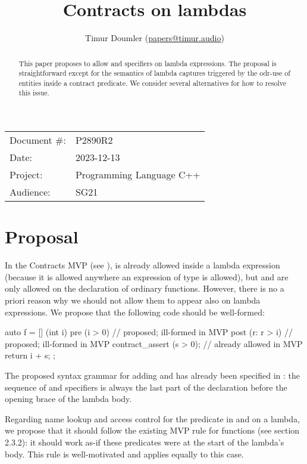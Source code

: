 


\title{Contracts on lambdas}
\author{ Timur Doumler \small(\href{mailto:papers@timur.audio}{papers@timur.audio})}
\date{}
\maketitle

\begin{tabular}{ll}
Document \#: & P2890R2 \\
Date: &2023-12-13 \\
Project: & Programming Language C++ \\
Audience: & SG21
\end{tabular}

\begin{abstract}
This paper proposes to allow  and  specifiers on lambda expressions. The proposal is straightforward except for the semantics of lambda captures triggered by the odr-use of entities inside a contract predicate. We consider several alternatives for how to resolve this issue.
\end{abstract}

\section{Proposal}
\label{sec:intro}

In the Contracts MVP (see \cite{P2900R2}),  is already allowed inside a lambda expression (because it is allowed anywhere an expression of type  is allowed), but  and  are only allowed on the declaration of ordinary functions. However, there is no a priori reason why we should not allow them to appear also on lambda expressions. We propose that the following code should be well-formed:
\begin{codeblock}
auto f = [] (int i)
  pre (i > 0)      // proposed; ill-formed in MVP
  post (r: r > i)  // proposed; ill-formed in MVP
{
  contract_assert (s > 0);  // already allowed in MVP
  return i + s;
};
\end{codeblock}

The proposed syntax grammar for adding  and  has already been specified in \cite{P2961R2}: the sequence of  and  specifiers is always the last part of the declaration before the opening brace of the lambda body.

Regarding name lookup and access control for the predicate in  and  on a lambda,  we propose that it should follow the existing  MVP rule for functions (see \cite{P2900R2} section 2.3.2): it should work as-if these predicates were at the start of the lambda's body. This rule is well-motivated and applies equally to this case.

